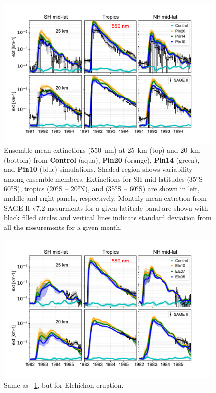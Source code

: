 \documentclass[acpd, hvmath, online]{copernicus_discussions}
\begin{document}
\newpage
\begin{figure}[ht!]
\includegraphics[width=1.0\textwidth,height=.6\textheight,trim={0.1cm 0.1cm 0.1cm 0.1cm},clip]{Pinatubo_ext_550.pdf}
\caption{Ensemble mean extinctions (550~nm) at 25~km (top) and 20~km (bottom) from \textbf{Control} (aqua), \textbf{Pin20} (orange), \textbf{Pin14} (green), and \textbf{Pin10} (blue) simulations. Shaded region shows variability among ensemble members. Extinctions for SH mid-latitudes (35\si{\degree}S -- 60\si{\degree}S), tropics (20\si{\degree}S -- 20\si{\degree}N), and  (35\si{\degree}S -- 60\si{\degree}S) are shown in left, middle and right panels, respectively. Monthly mean extiction from SAGE II v7.2 mesurments for a given latitude band are shown with black filled circles and vertical lines indicate standard deviation from all the mesurements for a given month. }
\label{fig:pext}
\end{figure}





\newpage
\begin{figure}[ht!]
\includegraphics[width=1.0\textwidth,height=.6\textheight,trim={0.1cm 0.1cm 0.1cm 0.1cm},clip]{Elchichon_ext_550.pdf}
\caption{Same as ~\ref{fig:pext}, but for Elchichon eruption.} 
\label{fig:eext}
\end{figure}
\end{document}
